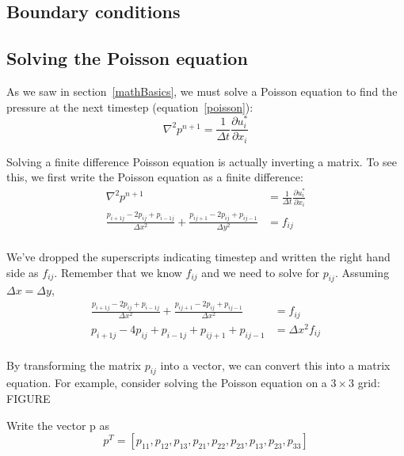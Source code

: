 \documentclass[12pt]{article}
\begin{document}
\subsection{Boundary conditions}

\subsection{Solving the Poisson equation}
As we saw in section~\ref{mathBasics}, we must solve a Poisson equation to find the pressure at the next timestep (equation~\ref{poisson}):
\[\nabla^2 p^{n+1} = \frac{1}{\Delta t}\frac{\partial u_i^*}{\partial x_i} \]

Solving a finite difference Poisson equation is actually inverting a matrix.  To see this, we first write the Poisson equation as a finite difference:
\begin{align*}
\nabla^2 p^{n+1} &= \frac{1}{\Delta t}\frac{\partial u_i^*}{\partial x_i} \\
\frac{p_{i+1j}-2p_{ij}+p_{i-1j}}{\Delta x^2} + \frac{p_{ij+1}-2p_{ij}+p_{ij-1}}{\Delta y^2} &= f_{ij}  \\
\end{align*}

We've dropped the superscripts indicating timestep and written the right hand side as $f_{ij}$.  Remember that we know $f_{ij}$ and we need to solve for $p_{ij}$.  Assuming $\Delta x = \Delta y$,
\begin{align*}
\frac{p_{i+1j}-2p_{ij}+p_{i-1j}}{\Delta x^2} + \frac{p_{ij+1}-2p_{ij}+p_{ij-1}}{\Delta x^2} &= f_{ij}  \\
p_{i+1j}-4p_{ij}+p_{i-1j}+ p_{ij+1}+p_{ij-1} &= \Delta x^2 f_{ij}  \\
\end{align*}

By transforming the matrix $p_{ij}$ into a vector, we can convert this into a matrix equation.  For example, consider solving the Poisson equation on a $3 \times 3$ grid:
FIGURE

Write the vector p as
\[ p^{T} = [p_{11}, p_{12}, p_{13}, p_{21}, p_{22}, p_{23}, p_{13}, p_{23}, p_{33}]\]
\end{document}
